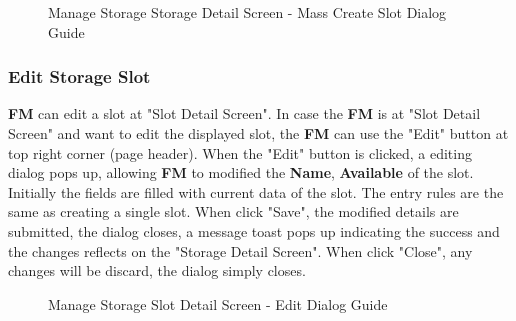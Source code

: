 \begin{figure}[H]
    \vspace{10pt}
    \caption{Manage Storage Storage Detail Screen - Mass Create Slot Dialog Guide}
	\label{fig:MSobjmassCreateSlotGuide}
\end{figure}


\subsubsection{Edit Storage Slot}
\textbf{FM} can edit a slot at "Slot Detail Screen".
In case the \textbf{FM} is at "Slot Detail Screen" and want to edit the displayed slot, the \textbf{FM} can use the "Edit" button at top right corner (page header). 
When the "Edit" button is clicked, a editing dialog pops up, allowing \textbf{FM} to modified the \textbf{Name}, \textbf{Available} of the slot. Initially the fields are filled with current data of the slot. The entry rules are the same as creating a single slot.
When click "Save", the modified details are submitted, the dialog closes, a message toast pops up indicating the success and the changes reflects on the "Storage Detail Screen". When click "Close", any changes will be discard, the dialog simply closes.

\begin{figure}[H]
	\centering
    \vspace{5pt}
    \hspace{5pt}
    \caption{Manage Storage Slot Detail Screen - Edit Dialog Guide}
	\label{fig:MSSlotDetailEditBtn}
\end{figure}

